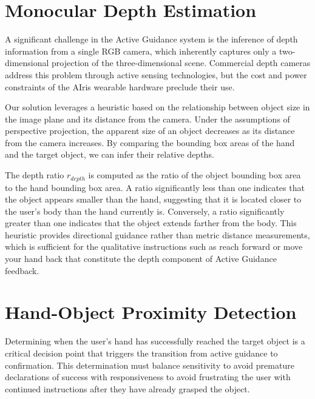 \documentclass[12pt,a4paper]{report}
\begin{document}
\section{Monocular Depth Estimation}

A significant challenge in the Active Guidance system is the inference of depth information from a single RGB camera, which inherently captures only a two-dimensional projection of the three-dimensional scene. Commercial depth cameras address this problem through active sensing technologies, but the cost and power constraints of the AIris wearable hardware preclude their use.

Our solution leverages a heuristic based on the relationship between object size in the image plane and its distance from the camera. Under the assumptions of perspective projection, the apparent size of an object decreases as its distance from the camera increases. By comparing the bounding box areas of the hand and the target object, we can infer their relative depths.

The depth ratio $r_{depth}$ is computed as the ratio of the object bounding box area to the hand bounding box area. A ratio significantly less than one indicates that the object appears smaller than the hand, suggesting that it is located closer to the user's body than the hand currently is. Conversely, a ratio significantly greater than one indicates that the object extends farther from the body. This heuristic provides directional guidance rather than metric distance measurements, which is sufficient for the qualitative instructions such as reach forward or move your hand back that constitute the depth component of Active Guidance feedback.

\section{Hand-Object Proximity Detection}

Determining when the user's hand has successfully reached the target object is a critical decision point that triggers the transition from active guidance to confirmation. This determination must balance sensitivity to avoid premature declarations of success with responsiveness to avoid frustrating the user with continued instructions after they have already grasped the object.
\end{document}
